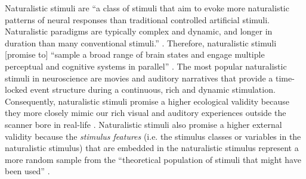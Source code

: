 Naturalistic stimuli are ``a class of stimuli that aim to evoke more
naturalistic patterns of neural responses than traditional controlled artificial
stimuli. Naturalistic paradigms are typically complex and dynamic, and longer in
duration than many conventional stimuli.'' \citep{vanderwal2019movies}.
%
Therefore, naturalistic stimuli [promise to] ``sample a broad range of brain
states and engage multiple perceptual and cognitive systems in parallel''
\citep{haxby2020naturalistic}.
The most popular naturalistic stimuli in neuroscience are movies and auditory
narratives \citep[s.][for reviews]{jaaskelainen2021movies,
jaaskelainen2020neural} that provide a time-locked event structure during a
continuous, rich and dynamic stimulation.
%
Consequently, naturalistic stimuli promise a higher ecological validity
\citep{zaki2009need, hasson2012future, hamilton2018revolution} because they more
closely mimic our rich visual and auditory experiences outside the scanner bore
in real-life \citep{hasson2008neurocinematics, haxby2020naturalistic}.
%
Naturalistic stimuli also promise a higher external validity because the
\textit{stimulus features} (i.e. the stimulus classes or variables in the
naturalistic stimulus) that are embedded in the naturalistic stimulus represent
a more random sample from the ``theoretical population of stimuli that might
have been used'' \citep{westfall2016fixing}.
%


